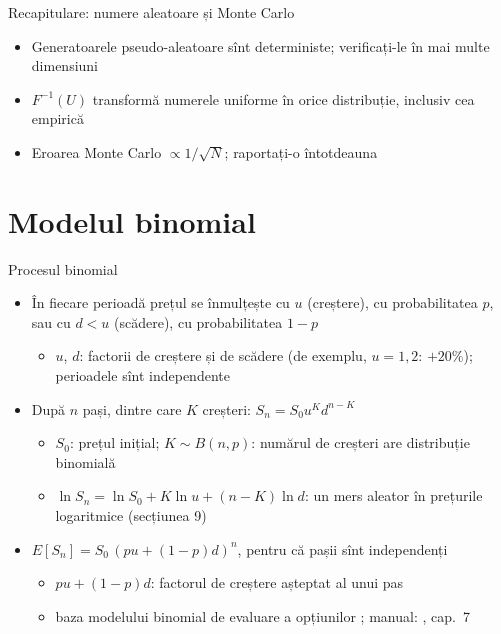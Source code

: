 \begin{frame}{Recapitulare: numere aleatoare și Monte Carlo}
\itemsize{\small}
\begin{itemize}
    \item Generatoarele pseudo-aleatoare sînt deterministe; verificați-le în mai multe dimensiuni
    \item $F^{-1}(U)$ transformă numerele uniforme în orice distribuție, inclusiv cea empirică
    \item Eroarea Monte Carlo $\propto 1/\sqrt{N}$; raportați-o întotdeauna
\end{itemize}
\end{frame}


\section{Modelul binomial}

\begin{frame}{Procesul binomial}
\itemsize{\footnotesize}
\begin{itemize}
    \item În fiecare perioadă prețul se înmulțește cu $u$ (creștere), cu probabilitatea $p$, sau cu $d < u$ (scădere), cu probabilitatea $1 - p$
    \begin{itemize}
        \item $u$, $d$: factorii de creștere și de scădere (de exemplu, $u = 1{,}2$: $+20\%$); perioadele sînt independente
    \end{itemize}
    \item După $n$ pași, dintre care $K$ creșteri: $S_n = S_0 u^K d^{n - K}$
    \begin{itemize}
        \item $S_0$: prețul inițial; $K \sim B(n, p)$: numărul de creșteri are distribuție binomială
        \item $\ln S_n = \ln S_0 + K\ln u + (n - K)\ln d$: un mers aleator în prețurile logaritmice (secțiunea 9)
    \end{itemize}
    \item $E[S_n] = S_0\,(pu + (1 - p)d)^n$, pentru că pașii sînt independenți
    \begin{itemize}
        \item $pu + (1 - p)d$: factorul de creștere așteptat al unui pas
        \item baza modelului binomial de evaluare a opțiunilor ; manual: , cap.~7
    \end{itemize}
\end{itemize}
\end{frame}

